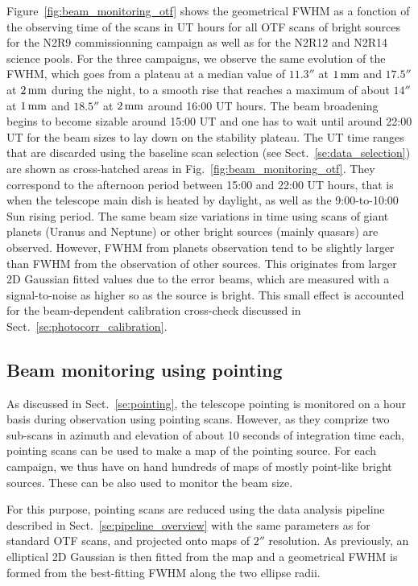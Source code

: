 Figure~\ref{fig:beam_monitoring_otf} shows the geometrical FWHM as a
fonction of the observing time of the scans in UT hours for all OTF
scans of bright sources for the N2R9 commissionning campaign as well
as for the N2R12 and N2R14 science pools. For the three campaigns, we
observe the same evolution of the FWHM, which goes from a plateau at a
median value of $11.3''$ at $1\,\rm{mm}$ and $17.5''$ at $2\,\rm{mm}$
during the night, to a smooth rise that reaches a maximum of about $14''$
at $1\,\rm{mm}$ and $18.5''$ at $2\,\rm{mm}$ around 16:00 UT
hours. The beam broadening begins to become sizable around 15:00 UT
and one has to wait until around 22:00 UT for the beam sizes to lay
down on the stability plateau. The UT time ranges that are discarded
using the baseline scan selection (see
Sect.~\ref{se:data_selection}) are shown as cross-hatched areas in
Fig.~\ref{fig:beam_monitoring_otf}. They correspond to the afternoon
period between 15:00 and 22:00 UT hours, that is when the
telescope main dish is heated by daylight, as well as the
9:00-to-10:00 Sun rising period. The same beam size variations in time
using scans of giant planets (Uranus and Neptune) or other bright
sources (mainly quasars) are observed. However, FWHM from planets
observation tend to be slightly larger than FWHM from the observation
of other sources. This originates from larger 2D Gaussian fitted
values due to the error beams, which are measured with a
signal-to-noise as higher so as the source is bright. This small
effect is accounted for the beam-dependent calibration cross-check
discussed in Sect.~\ref{se:photocorr_calibration}.



\subsection{Beam monitoring using pointing}

As discussed in Sect.~\ref{se:pointing}, the telescope pointing is
monitored on a hour basis during observation using pointing
scans. However, as they comprize two sub-scans in azimuth and
elevation of about 10 seconds of integration time each, pointing scans
can be used to make a map of the pointing source. For each campaign,
we thus have on hand hundreds of maps of mostly point-like bright
sources. These can be also used to monitor the beam size.

For this purpose, pointing scans are reduced using
the data analysis pipeline described in
Sect.~\ref{se:pipeline_overview} with the same parameters as for
standard OTF scans, and projected onto maps of $2''$ resolution.
As previously, an elliptical 2D Gaussian is then fitted from the map
and a geometrical FWHM is formed from the best-fitting FWHM along the
two ellipse radii.  


